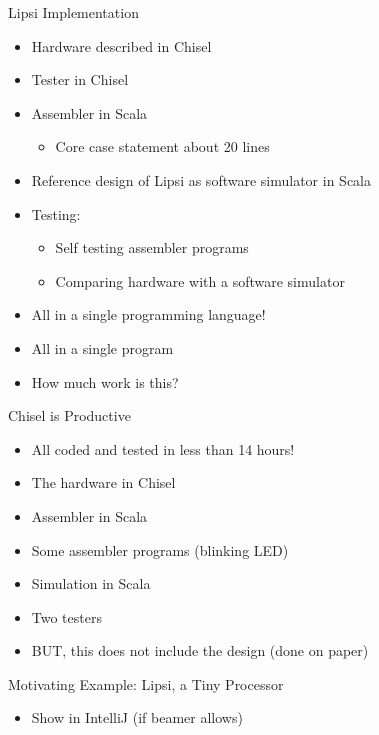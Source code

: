 \documentclass[xcolor=pdflatex,dvipsnames,table]{beamer}
\begin{document}
\begin{frame}[fragile]{Lipsi Implementation}
\begin{itemize}
\item Hardware described in Chisel
\item Tester in Chisel
\item Assembler in Scala
\begin{itemize}
\item Core case statement about 20 lines
\end{itemize}
\item Reference design of Lipsi as software simulator in Scala
\item Testing:
\begin{itemize}
\item Self testing assembler programs
\item Comparing hardware with a software simulator
\end{itemize}
\item All in a single programming language!
\item All in a single program
\item How much work is this?
\end{itemize}
\end{frame}

\begin{frame}[fragile]{Chisel is Productive}
\begin{itemize}
\item All coded and tested in less than 14 hours!
\end{itemize}
\begin{itemize}
\item The hardware in Chisel
\item Assembler in Scala
\item Some assembler programs (blinking LED)
\item Simulation in Scala
\item Two testers
\end{itemize}
\begin{itemize}
\item BUT, this does not include the design (done on paper)
\end{itemize}
\end{frame}

\begin{frame}[fragile]{Motivating Example: Lipsi, a Tiny Processor}
\begin{itemize}
\item Show in IntelliJ (if beamer allows)
\end{itemize}
\end{frame}
\end{document}
